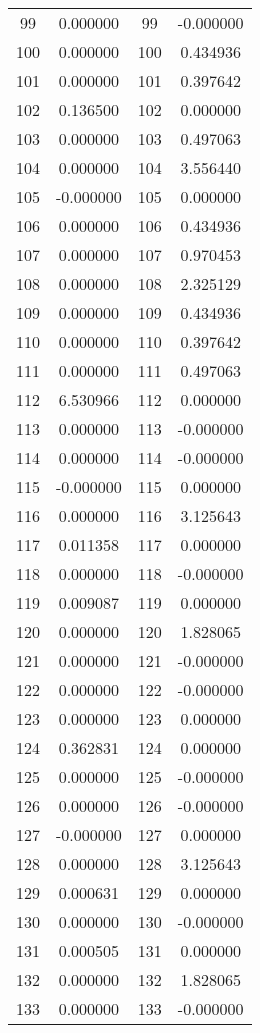 \documentclass[12pt]{article}
\begin{document}
\begin{longtable}{@{}cccc@{}}
99 & 0.000000 & 99 & -0.000000 \\
100 & 0.000000 & 100 & 0.434936 \\
101 & 0.000000 & 101 & 0.397642 \\
102 & 0.136500 & 102 & 0.000000 \\
103 & 0.000000 & 103 & 0.497063 \\
104 & 0.000000 & 104 & 3.556440 \\
105 & -0.000000 & 105 & 0.000000 \\
106 & 0.000000 & 106 & 0.434936 \\
107 & 0.000000 & 107 & 0.970453 \\
108 & 0.000000 & 108 & 2.325129 \\
109 & 0.000000 & 109 & 0.434936 \\
110 & 0.000000 & 110 & 0.397642 \\
111 & 0.000000 & 111 & 0.497063 \\
112 & 6.530966 & 112 & 0.000000 \\
113 & 0.000000 & 113 & -0.000000 \\
114 & 0.000000 & 114 & -0.000000 \\
115 & -0.000000 & 115 & 0.000000 \\
116 & 0.000000 & 116 & 3.125643 \\
117 & 0.011358 & 117 & 0.000000 \\
118 & 0.000000 & 118 & -0.000000 \\
119 & 0.009087 & 119 & 0.000000 \\
120 & 0.000000 & 120 & 1.828065 \\
121 & 0.000000 & 121 & -0.000000 \\
122 & 0.000000 & 122 & -0.000000 \\
123 & 0.000000 & 123 & 0.000000 \\
124 & 0.362831 & 124 & 0.000000 \\
125 & 0.000000 & 125 & -0.000000 \\
126 & 0.000000 & 126 & -0.000000 \\
127 & -0.000000 & 127 & 0.000000 \\
128 & 0.000000 & 128 & 3.125643 \\
129 & 0.000631 & 129 & 0.000000 \\
130 & 0.000000 & 130 & -0.000000 \\
131 & 0.000505 & 131 & 0.000000 \\
132 & 0.000000 & 132 & 1.828065 \\
133 & 0.000000 & 133 & -0.000000 \\

\end{longtable}
\end{document}
